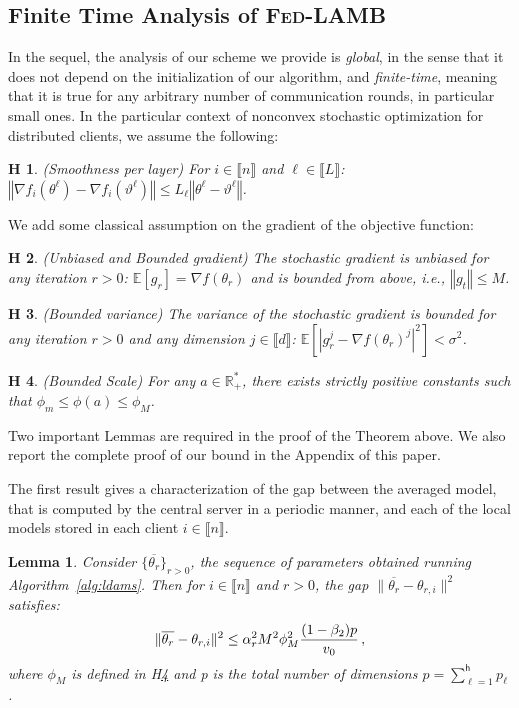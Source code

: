 \documentclass[11pt]{article}
\newtheorem{Lemma}{Lemma}
\newtheorem{assumption}{H\!\!}
\newcommand{\beq}{\begin{equation}}
\newcommand{\eeq}{\end{equation}}
\def\EE{\mathbb{E}}
\newcommand{\norm}[1]{\left\Vert #1 \right\Vert}
\def\rset{\ensuremath{\mathbb{R}}}
\newcommand{\inter}{\llbracket n \rrbracket}
\newcommand{\interl}{\llbracket L \rrbracket}
\def\tot{\mathsf{h}}
\newcommand{\algo}{\textsc{Fed-LAMB}}
\begin{document}
\subsection{Finite Time Analysis of \algo}
In the sequel, the analysis of our scheme we provide is \emph{global}, in the sense that it does not depend on the initialization of our algorithm, and \emph{finite-time}, meaning that it is true for any arbitrary number of communication rounds, in particular small ones.
In the particular context of nonconvex stochastic optimization for distributed clients, we assume the following:

\vspace{0.1in}

\begin{assumption}\label{ass:smooth}(Smoothness per layer)
For $i \in \inter$ and $\ell \in \interl$: $\norm{\nabla f_i (\theta^\ell) - \nabla f_i (\vartheta^\ell)} \leq L_\ell \norm{\theta^\ell-\vartheta^\ell}$.
\end{assumption}
We add some classical assumption on the gradient of the objective function:
\begin{assumption}\label{ass:boundgrad}(Unbiased and Bounded gradient)
The stochastic gradient is unbiased for any iteration $r>0$: $\EE[g_r] = \nabla f(\theta_r)$ and is bounded from above, i.e., $\norm{g_t} \leq M$.
\end{assumption}

\begin{assumption}\label{ass:var}(Bounded variance)
The variance of the stochastic gradient is bounded for any iteration $r>0$ and any dimension $j \in \llbracket d \rrbracket$: $\EE[|g_r^j - \nabla f(\theta_r)^j|^2] < \sigma^2$.
\end{assumption}

\begin{assumption}\label{ass:phi}(Bounded Scale)
For any $a \in \rset^*_+$, there exists strictly positive constants such that $\phi_m \leq  \phi(a) \leq \phi_M$.
\end{assumption}



Two important Lemmas are required in the proof of the Theorem above.
We also report the complete proof of our bound in the Appendix of this paper.

The first result gives a characterization of the gap between the averaged model, that is computed by the central server in a periodic manner, and each of the local models stored in each client $i \in \inter$.
\begin{Lemma}\label{lemma:iterates}
Consider $\{\overline{\theta_r}\}_{r>0}$, the sequence of parameters obtained running Algorithm~\ref{alg:ldams}. Then for $i \in \inter$ and $r > 0$, the gap $\| \overline{\theta_r} - \theta_{r,i} \|^2$ satisfies:
\beq\notag
\| \overline{\theta_r} - \theta_{r,i} \|^2 \leq \alpha_r^2 M^2 \phi_M^2 \frac{(1-\beta_2)p}{v_0} \, ,
\eeq
where $\phi_M$ is defined in H\ref{ass:phi} and p is the total number of dimensions $p = \sum_{\ell = 1}^\tot p_\ell$.
\end{Lemma}
\end{document}

